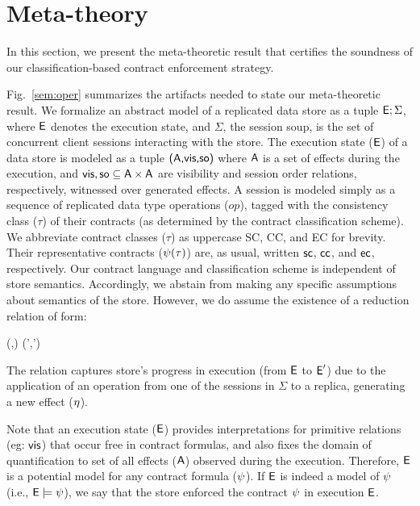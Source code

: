 \section{Meta-theory}
\label{sec:core-opsem}

In this section, we present the meta-theoretic result that certifies
the soundness of our classification-based contract enforcement
strategy.

Fig.~\ref{sem:oper} summarizes the artifacts needed to state our
meta-theoretic result. We formalize an abstract model of a replicated
data store as a tuple ${\normalfont \textsf{E}};\Sigma$, where ${\normalfont \textsf{E}}$ denotes the execution
state, and $\Sigma$, the session soup, is the set of concurrent client
sessions interacting with the store. The execution state (${\normalfont \textsf{E}}$) of a
data store is modeled as a tuple ${\normalfont \textsf{({\normalfont \textsf{A}},\allowbreak {\normalfont \textsf{vis}},\allowbreak {\normalfont \textsf{so}})}}$ where ${\normalfont \textsf{A}}$ is a set of
effects during the execution, and ${\normalfont \textsf{vis}},{\normalfont \textsf{so}} \subseteq {\normalfont \textsf{A}}
\times {\normalfont \textsf{A}}$ are visibility and session order relations,
respectively, witnessed over generated effects. A session is modeled
simply as a sequence of replicated data type operations ($op$), tagged
with the consistency class ($\tau$) of their contracts (as determined
by the contract classification scheme). We abbreviate contract classes
($\tau$) as uppercase {\sf SC}, {\sf CC}, and {\sf EC} for brevity.
Their representative contracts ($\psi(\tau)$) are, as usual, written
${\sf sc}$, ${\sf cc}$, and ${\sf ec}$, respectively.  Our contract language and
classification scheme is independent of store semantics. Accordingly,
we abstain from making any specific assumptions about semantics of the
store. However, we do assume the existence of a reduction relation of
form:

\begin{smathpar}
  \auxred{} {(\E,\Sigma)} {\eff} {(\E',\Sigma')}
\end{smathpar}

\noindent The relation captures store's progress in execution (from
${\normalfont \textsf{E}}$ to ${\normalfont \textsf{E}}'$) due to the application of an operation from one of the
sessions in $\Sigma$ to a replica, generating a new effect ($\eta$).

Note that an execution state (${\normalfont \textsf{E}}$) provides interpretations for
primitive relations (eg: ${\normalfont \textsf{vis}}$) that occur free in contract
formulas, and also fixes the domain of quantification to set of all
effects (${\normalfont \textsf{A}}$) observed during the execution. Therefore, ${\normalfont \textsf{E}}$ is
a potential model for any contract formula ($\psi$). If ${\normalfont \textsf{E}}$ is indeed
a model of $\psi$ (i.e., ${\normalfont \textsf{E}} \models \psi$), we say that the store
enforced the contract $\psi$ in execution ${\normalfont \textsf{E}}$.

